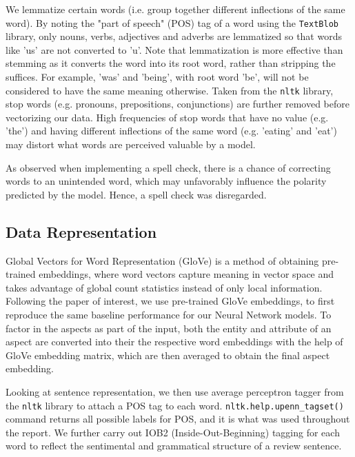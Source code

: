 \documentclass[comsoc,conference]{IEEEtran}
\begin{document}
We lemmatize certain words (i.e. group together different inflections of the same word). By noting the "part of speech"  (POS) tag of a word using the \texttt{TextBlob} library, only nouns, verbs, adjectives and adverbs are lemmatized so that words like 'us' are not converted to 'u'. Note that lemmatization is more effective than stemming as it converts the word into its root word, rather than stripping the suffices. For example, 'was' and 'being', with root word 'be', will not be considered to have the same meaning otherwise. Taken from the \texttt{nltk} library, stop words (e.g. pronouns, prepositions, conjunctions) are further removed before vectorizing our data. High frequencies of stop words that have no value (e.g. 'the') and having different inflections of the same word (e.g. 'eating' and 'eat') may distort what words are perceived valuable by a model.

As observed when implementing a spell check, there is a chance of correcting words to an unintended word, which may unfavorably influence the polarity predicted by the model. Hence, a spell check was disregarded.

\subsection{Data Representation}

Global Vectors for Word Representation (GloVe) \cite{GloVe} is a method of obtaining pre-trained embeddings, where word vectors capture meaning in vector space and takes advantage of global count statistics instead of only local information. Following the paper of interest, we use pre-trained GloVe embeddings, to first reproduce the same baseline performance for our Neural Network models. To factor in the aspects as part of the input, both the entity and attribute of an aspect are converted into their the respective word embeddings with the help of GloVe embedding matrix, which are then averaged to obtain the final aspect embedding.

Looking at sentence representation, we then use average perceptron tagger from the \texttt{nltk} library to attach a POS tag to each word. \texttt{nltk.help.upenn\_tagset()} command returns all possible labels for POS, and it is what was used throughout the report. We further carry out IOB2 (Inside-Out-Beginning) tagging for each word to reflect the sentimental and grammatical structure of a review sentence. 
\end{document}

